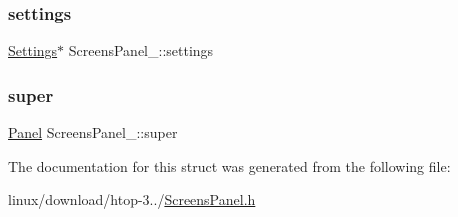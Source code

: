 \mbox{\label{structScreensPanel___acbbcee5a923b68441ac783a11fa64b5e}} 
\subsubsection{\texorpdfstring{settings}{settings}}
{\footnotesize\ttfamily \hyperlink{Settings_8h_ad97e5960b63f21c02bf5e0e43c0ef002}{Settings}$\ast$ Screens\+Panel\+\_\+\+::settings}

\mbox{\label{structScreensPanel___a252518387b381f1b88b4f56797e94cf3}} 
\subsubsection{\texorpdfstring{super}{super}}
{\footnotesize\ttfamily \hyperlink{Panel_8h_a034d4c16521db412dc7a1e8536d16fae}{Panel} Screens\+Panel\+\_\+\+::super}



The documentation for this struct was generated from the following file\+:\begin{DoxyCompactItemize}
\item 
linux/download/htop-\/3../\hyperlink{ScreensPanel_8h}{Screens\+Panel.\+h}\end{DoxyCompactItemize}
